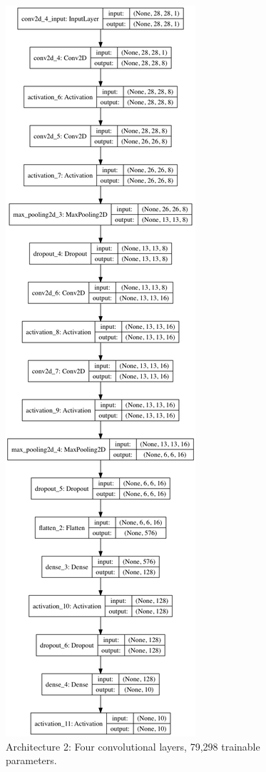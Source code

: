 \documentclass[letterpaper, 10 pt, conference]{ieeeconf}  %
\begin{document}
\begin{figure}[H]
      \centering
      \includegraphics[scale = .3]{model1.png}
		\centering
      \caption{Architecture 2: Four convolutional layers, 79,298 trainable parameters.}
      \label{figurelabel}
   \end{figure}
   
\end{document}
